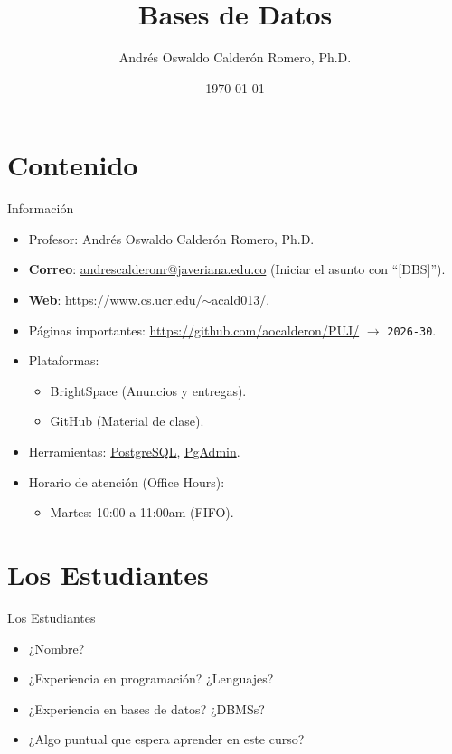 \documentclass[aspectratio=169]{beamer}
\title{Bases de Datos}
\author{Andrés Oswaldo Calderón Romero, Ph.D.}
\date{\today}
\begin{document}
\frame{\titlepage}

\section{Contenido}

\begin{frame}{Información}
\begin{itemize}
    \item Profesor: Andrés Oswaldo Calderón Romero, Ph.D.
    \item \textbf{Correo}: \href{mailto:andrescalderonr@javeriana.edu.co}{andrescalderonr@javeriana.edu.co} (Iniciar el asunto con ``[DBS]'').
    \item \textbf{Web}: \href{https://www.cs.ucr.edu/~acald013/}{https://www.cs.ucr.edu/$\sim$acald013/}.
    \item Páginas importantes: \url{https://github.com/aocalderon/PUJ/} $\longrightarrow$ \texttt{2026-30}.
    \item Plataformas: 
    \begin{itemize}
        \item BrightSpace (Anuncios y entregas).
        \item GitHub (Material de clase).
    \end{itemize}
    \item Herramientas:  \href{https://www.postgresql.org/}{PostgreSQL}, \href{https://www.pgadmin.org/}{PgAdmin}.
    \item Horario de atención (Office Hours):
    \begin{itemize}
        \item Martes: 10:00 a 11:00am (FIFO).
    \end{itemize}
\end{itemize}
\end{frame}

\section{Los Estudiantes}

\begin{frame}{Los Estudiantes}
\begin{itemize}
    \item ¿Nombre? 
    \item ¿Experiencia en programación? ¿Lenguajes? 
    \item ¿Experiencia en bases de datos? ¿DBMSs?
    \item ¿Algo puntual que espera aprender en este curso?
\end{itemize}
\end{frame}
\end{document}
